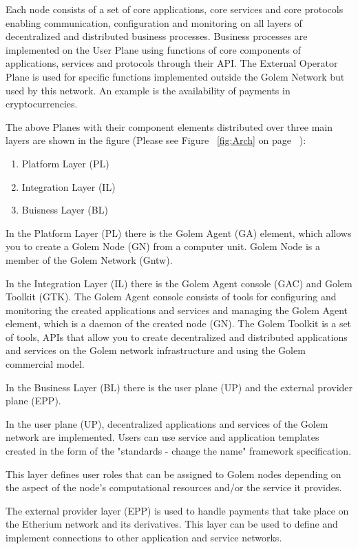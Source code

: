 Each node consists of a set of core applications, core services
and core protocols enabling communication, configuration and monitoring 
on all layers of decentralized and distributed business processes.
Business processes are implemented on the User Plane using functions of 
core components of applications, services and protocols through their API.
The External Operator Plane is used for specific functions implemented
outside the Golem Network but used by this network. An example is the availability of
payments in cryptocurrencies.

The above Planes with their component elements distributed over three main layers 
are shown in the figure (Please see Figure ~\ref{fig:Arch} on page ~\pageref{fig:Arch}):

\begin{enumerate}
	\item Platform Layer (PL)
	\item Integration Layer (IL)
	\item Buisness Layer (BL)
\end{enumerate}

In the Platform Layer (PL) there is the Golem Agent (GA) element,
which allows you to create a Golem Node (GN) from a computer unit.
Golem Node is a member of the Golem Network (Gntw).

In the Integration Layer (IL) there is the Golem Agent console (GAC) and Golem Toolkit (GTK).
The Golem Agent console consists of tools for configuring and monitoring the created applications and services
and managing the Golem Agent element, which is a daemon of the created node (GN).
The Golem Toolkit is a set of tools, APIs that allow you to create decentralized and distributed applications and services
on the Golem network infrastructure and using the Golem commercial model.

In the Business Layer (BL) there is the user plane (UP) and the external provider plane (EPP).

In the user plane (UP), decentralized applications and services of the Golem network are implemented.
Users can use service and application templates created in the form of the "standards - change the name" framework specification.

This layer defines user roles that can be assigned to Golem nodes depending on the aspect of the node's computational resources and/or the service it provides.

The external provider layer (EPP) is used to handle payments that take place on the Etherium network and its derivatives.
This layer can be used to define and implement connections to other application and service networks.

